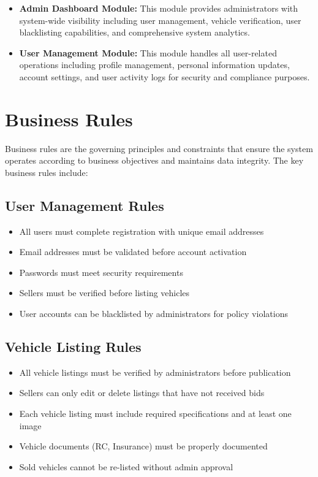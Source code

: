 \begin{itemize}
    \item \textbf{Admin Dashboard Module:} This module provides administrators with system-wide visibility including user management, vehicle verification, user blacklisting capabilities, and comprehensive system analytics.
    
    \item \textbf{User Management Module:} This module handles all user-related operations including profile management, personal information updates, account settings, and user activity logs for security and compliance purposes.
\end{itemize}

\section{Business Rules}
Business rules are the governing principles and constraints that ensure the system operates according to business objectives and maintains data integrity. The key business rules include:

\subsection{User Management Rules}
\begin{itemize}
    \item All users must complete registration with unique email addresses
    \item Email addresses must be validated before account activation
    \item Passwords must meet security requirements
    \item Sellers must be verified before listing vehicles
    \item User accounts can be blacklisted by administrators for policy violations
\end{itemize}

\subsection{Vehicle Listing Rules}
\begin{itemize}
    \item All vehicle listings must be verified by administrators before publication
    \item Sellers can only edit or delete listings that have not received bids
    \item Each vehicle listing must include required specifications and at least one image
    \item Vehicle documents (RC, Insurance) must be properly documented
    \item Sold vehicles cannot be re-listed without admin approval
\end{itemize}

